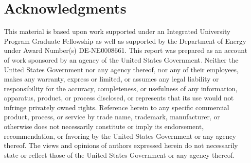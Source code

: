 \documentclass{article} %
\begin{document}
\pagebreak
\section*{Acknowledgments}

This material is based upon work supported under an Integrated
University Program Graduate Fellowship as well as supported by the Department 
of Energy under Award Number(s) DE-NE0008661. This report was prepared as an
account of work sponsored by an agency of the United States Government.
Neither the United States Government nor any agency thereof, nor any of their
employees, makes any warranty, express or limited, or assumes any legal
liability or responsibility for the accuracy, completeness, or usefulness of
any information, apparatus, product, or process disclosed, or represents that
its use would not infringe privately owned rights. Reference herein to any 
specific commercial product, process, or service by trade name, trademark, 
manufacturer, or otherwise does not necessarily constitute or imply its 
endorsement, recommendation, or favoring by the United States Government or
any agency thereof. The views and opinions of authors expressed herein do not 
necessarily state or reflect those of the United States Government or any 
agency thereof.

\pagebreak



\end{document}
